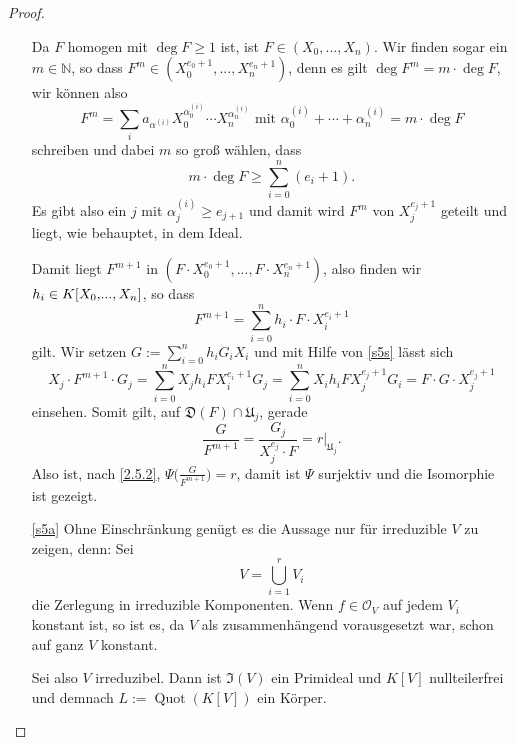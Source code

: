 \documentclass[a4paper,12pt,index=toc]{scrbook}
\theoremstyle{keinenummern} %
\def\I{\mathfrak{I}}
\def\O{\mathcal{O}}
\newcommand{\D}{\mathfrak{D}}
\def\U{\mathfrak{U}}
\newcommand{\Quot}{\operatorname{Quot}}
\newcommand{\restrict}[1]{|_{#1}}
\renewcommand{\dotsc}{\ensuremath{\!...}}
\newcommand{\set}[1]{\ensuremath{\mathbb{#1}}}
\newcommand{\N}{\set{N}}
\newcommand{\ppolyx}[1][n]{\ensuremath%
  [X_{0},\dotsc,X_{#1}]}
\begin{document}
\begin{proof}
\begin{enumerate}
Da $F$ homogen mit $\deg F\geq 1$ ist, ist $F\in(X_{0},\dotsc,X_{n})$. Wir finden sogar ein $m\in\N$, so dass $F^{m}\in(X_{0}^{e_{0}+1},\dotsc,X_{n}^{e_{n}+1})$, denn es gilt $\deg F^{m}=m\cdot\deg F$, wir können also
\begin{equation*}F^{m}=\sum_{i}a_{\alpha^{(i)}}X_{0}^{\alpha_{0}^{(i)}}\dotsm X_{n}^{\alpha_{n}^{(i)}}\text{ mit }\alpha_{0}^{(i)}+\dotsm+\alpha_{n}^{(i)}=m\cdot\deg F\end{equation*}
schreiben und dabei $m$ so groß wählen, dass
\begin{equation*}m\cdot\deg F\geq\sum_{i=0}^{n}(e_{i}+1).\end{equation*}
Es gibt also ein $j$ mit $\alpha_{j}^{(i)}\geq e_{j+1}$ und damit wird $F^{m}$ von $X_{j}^{e_{j}+1}$ geteilt und liegt, wie behauptet, in dem Ideal.

Damit liegt $F^{m+1}$ in $(F\cdot X_{0}^{e_{0}+1},\dotsc,F\cdot X_{n}^{e_{n}+1})$, also finden wir $h_{i}\in K\ppolyx$, so dass
\begin{equation*}F^{m+1}=\sum_{i=0}^{n}h_{i}\cdot F\cdot X_{i}^{e_{i}+1}\end{equation*}
gilt. Wir setzen $\displaystyle G:=\sum_{i=0}^{n}h_{i}G_{i}X_{i}$ und mit Hilfe von \cref{s5s} lässt sich
\begin{equation*}X_{j}\cdot F^{m+1}\cdot G_{j}=\sum_{i=0}^{n}X_{j}h_{i}FX_{i}^{e_{i}+1}G_{j}=\sum_{i=0}^{n}X_{i}h_{i}FX_{j}^{e_{j}+1}G_{i}=F\cdot G\cdot X_{j}^{e_{j}+1}\end{equation*}
einsehen. Somit gilt, auf $\D(F)\cap \U_{j}$, gerade \begin{equation*}\frac{G}{F^{m+1}}=\frac{G_{j}}{X_{j}^{e_{j}}\cdot F}=r\restrict{\U_{j}}.\end{equation*} Also ist, nach \cref{2.5.2}, $\Psi\bigl(\frac{G}{F^{m+1}}\bigr)=r$, damit ist $\Psi$ surjektiv und die Isomorphie ist gezeigt.

\item[\ref{s5a}] Ohne Einschränkung genügt es die Aussage nur für irreduzible $V$ zu zeigen, denn: Sei
\begin{equation*}V=\bigcup_{i=1}^{r}V_{i}\end{equation*}
die Zerlegung in irreduzible Komponenten. Wenn $f\in\O_{V}$ auf jedem $V_{i}$ konstant ist, so ist es, da $V$ als zusammenhängend vorausgesetzt war, schon auf ganz $V$ konstant.

Sei also $V$ irreduzibel. Dann ist $\I(V)$ ein Primideal und $K[V]$ nullteilerfrei und demnach $L:=\Quot(K[V])$ ein Körper.


\end{enumerate}
\end{proof}
\end{document}
